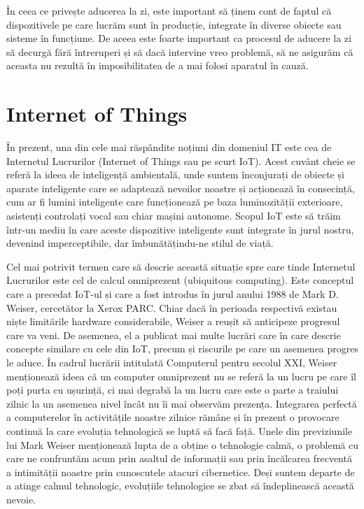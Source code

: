 În ceea ce privește aducerea la zi, este important să ținem cont de faptul că
dispozitivele pe care lucrăm sunt în producție, integrate în diverse obiecte sau
sisteme în funcțiune. De aceea este foarte important ca procesul de aducere la
zi să decurgă fără întreruperi și să dacă intervine vreo problemă, să ne
asigurăm că aceasta nu rezultă în imposibilitatea de a mai folosi aparatul în
cauză.

\section{Internet of Things}
\label{sec:embed-iot}

În prezent, una din cele mai răspândite noțiuni din domeniul IT este cea de
Internetul Lucrurilor (Internet of Things sau pe scurt IoT). Acest cuvânt cheie
se referă la ideea de inteligență ambientală, unde suntem înconjurați de obiecte
și aparate inteligente care se adaptează nevoilor noastre și acționează în
consecință, cum ar fi lumini inteligente care funcționează pe baza luminozității
exterioare, asistenți controlați vocal sau chiar mașini autonome. Scopul IoT
este să trăim într-un mediu în care aceste dispozitive inteligente sunt
integrate în jurul nostru, devenind imperceptibile, dar îmbunătățindu-ne stilul
de viață.

Cel mai potrivit termen care să descrie această situație spre care tinde
Internetul Lucrurilor este cel de calcul omniprezent (ubiquitous computing).
Este conceptul care a precedat IoT-ul și care a fost introdus în jurul anului
1988 de Mark D. Weiser, cercetător la Xerox PARC. Chiar dacă în perioada
respectivă existau niște limitările hardware considerabile, Weiser a reușit să
anticipeze progresul care va veni. De asemenea, el a publicat mai multe lucrări
care în care descrie concepte similare cu cele din IoT, precum și riscurile pe
care un asemenea progres le aduce. În cadrul lucrării intitulată Computerul
pentru secolul XXI, Weiser menționează ideea că un computer omniprezent nu se
referă la un lucru pe care îl poți purta cu ușurință, ci mai degrabă la un lucru
care este o parte a traiului zilnic la un asemenea nivel încât nu îi mai
observăm prezența. Integrarea perfectă a computerelor în activitățile noastre
zilnice rămâne și în prezent o provocare continuă la care evoluția tehnologică
se luptă să facă față. Unele din previziunile lui Mark Weiser menționează lupta
de a obține o tehnologie calmă, o problemă cu care ne confruntăm acum prin
asaltul de informații sau prin încălcarea frecventă a intimității noastre prin
cunoscutele atacuri cibernetice. Deși suntem departe de a atinge calmul
tehnologic, evoluțiile tehnologice se zbat să îndeplinească această nevoie.

